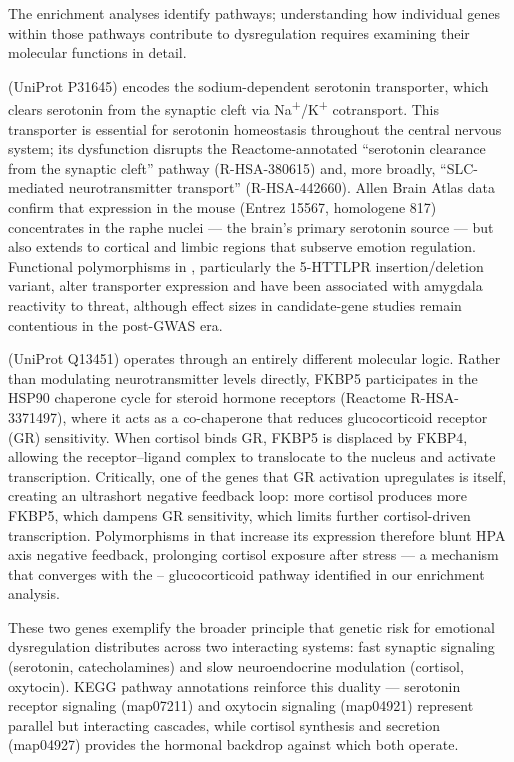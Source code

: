 The enrichment analyses identify pathways; understanding how individual genes
within those pathways contribute to dysregulation requires examining their
molecular functions in detail.

 (UniProt P31645) encodes the sodium-dependent serotonin
transporter, which clears serotonin from the synaptic cleft via Na\textsuperscript{+}/K\textsuperscript{+}
cotransport.\cite{uniprot2023}
This transporter is essential for serotonin homeostasis throughout the central
nervous system; its dysfunction disrupts the Reactome-annotated ``serotonin
clearance from the synaptic cleft'' pathway (R-HSA-380615) and, more broadly,
``SLC-mediated neurotransmitter transport'' (R-HSA-442660).\cite{gillespie2022}
Allen Brain Atlas data confirm that  expression in the mouse
(Entrez 15567, homologene 817) concentrates in the raphe nuclei — the brain's
primary serotonin source — but also extends to cortical and limbic
regions that subserve emotion regulation.\cite{hawrylycz2012}
Functional polymorphisms in , particularly the 5-HTTLPR
insertion/deletion variant, alter transporter expression and have been
associated with amygdala reactivity to threat, although effect sizes in
candidate-gene studies remain contentious in the post-GWAS era.\cite{silverman2019}

 (UniProt Q13451) operates through an entirely different molecular
logic.
Rather than modulating neurotransmitter levels directly, FKBP5 participates in
the HSP90 chaperone cycle for steroid hormone receptors
(Reactome R-HSA-3371497), where it acts as a co-chaperone that reduces
glucocorticoid receptor (GR) sensitivity.\cite{gillespie2022}
When cortisol binds GR, FKBP5 is displaced by FKBP4, allowing the
receptor--ligand complex to translocate to the nucleus and activate
transcription.
Critically, one of the genes that GR activation upregulates is 
itself, creating an ultrashort negative feedback loop: more cortisol produces
more FKBP5, which dampens GR sensitivity, which limits further cortisol-driven
transcription.\cite{udalov2026}
Polymorphisms in  that increase its expression therefore blunt HPA
axis negative feedback, prolonging cortisol exposure after stress — a mechanism
that converges with the -- glucocorticoid pathway
identified in our enrichment analysis.

These two genes exemplify the broader principle that genetic risk for emotional
dysregulation distributes across two interacting systems: fast synaptic
signaling (serotonin, catecholamines) and slow neuroendocrine modulation
(cortisol, oxytocin).
KEGG pathway annotations reinforce this duality — serotonin receptor signaling
(map07211) and oxytocin signaling (map04921) represent parallel but interacting
cascades, while cortisol synthesis and secretion (map04927) provides the
hormonal backdrop against which both operate.\cite{kanehisa2023}


